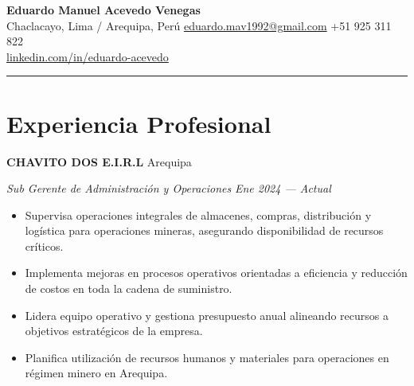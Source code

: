 \documentclass[11pt,letterpaper]{article}
\newcommand{\entry}[4]{%
  \noindent\textbf{#1} \hfill #2 \par\nopagebreak
  \textit{#3} \hfill \textit{#4} \par\nopagebreak
}
\begin{document}
\begin{center}
  {\LARGE\bfseries Eduardo Manuel Acevedo Venegas} \\[4pt]
  \enspace Chaclacayo, Lima / Arequipa, Per\'u
  \quad{}\enspace \href{mailto:eduardo.mav1992@gmail.com}{eduardo.mav1992@gmail.com}
  \quad{}\enspace +51 925 311 822
  \\[2pt]
  \enspace \href{https://www.linkedin.com/in/eduardo-acevedo-038571164/}{linkedin.com/in/eduardo-acevedo}
\end{center}

\vspace{-0.4em}
\noindent\rule{\textwidth}{0.8pt}
\vspace{-0.8em}

\section{Experiencia Profesional}

\entry{CHAVITO DOS E.I.R.L}{Arequipa}{Sub Gerente de Administraci\'on y Operaciones}{Ene 2024 --- Actual}
\begin{itemize}
  \item Supervisa operaciones integrales de almacenes, compras, distribuci\'on y log\'istica para operaciones mineras, asegurando disponibilidad de recursos cr\'iticos.
  \item Implementa mejoras en procesos operativos orientadas a eficiencia y reducci\'on de costos en toda la cadena de suministro.
  \item Lidera equipo operativo y gestiona presupuesto anual alineando recursos a objetivos estrat\'egicos de la empresa.
  \item Planifica utilizaci\'on de recursos humanos y materiales para operaciones en r\'egimen minero en Arequipa.
\end{itemize}
\vspace{0.3em}
\end{document}
